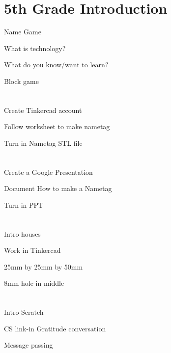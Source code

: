 \documentclass{article}
\begin{document}
\newpage
\section{5th Grade Introduction}
\begin{todolist}
	\item Name Game
	\item What is technology?
	\item What do you know/want to learn?
	\item Block game
\end{todolist}
\section{\FifthGradeone}
\begin{todolist}
	\item Create Tinkercad account
	\item Follow worksheet to make nametag
	\item Turn in Nametag STL file
\end{todolist}
\section{\FifthGradetwo}
\begin{todolist}
	\item Create a Google Presentation
	\item Document How to make a Nametag
	\item Turn in PPT
\end{todolist}
\section{\FifthGradeThree}
\begin{todolist}
	\item Intro houses
	\item Work in Tinkercad
	\item 25mm by 25mm by 50mm
	\item 8mm hole in middle 
\end{todolist}
\section{\FifthGradeFour}
\begin{todolist}
	\item Intro Scratch
	\item CS link-in Gratitude conversation
	\item Message passing
\end{todolist}
\end{document}
